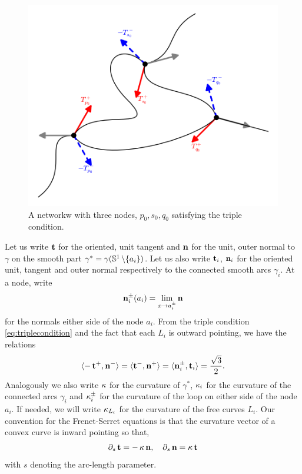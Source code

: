 \documentclass[11pt]{amsart}
\begin{document}
\begin{figure}[htb]
\centering
\includegraphics[width=.9\linewidth]{network}
\caption{A networkw with three nodes, $p_0, s_0, q_0$ satisfying the triple condition.}
\label{fg:network}
\end{figure}

Let us write \(\operatorname{\mathbf{t}}\) for the oriented, unit tangent and \(\operatorname{\mathbf{n}}\) for the unit, outer normal to \(\gamma\) on the smooth part \(\gamma^{\ast} = \gamma(\mathbb{S}^1\operatorname{\backslash}\{a_i\})\). Let us also write \(\operatorname{\mathbf{t}}_i\), \(\operatorname{\mathbf{n}}_i\) for the oriented unit, tangent and outer normal respectively to the connected smooth arcs \(\gamma_i\). At a node, write
\[
\operatorname{\mathbf{n}}_i^{\pm}(a_i) = \lim_{x\to a_i^{\pm}} \operatorname{\mathbf{n}}
\]
for the normals either side of the node \(a_i\). From the triple condition \eqref{eq:triplecondition} and the fact that each \(L_i\) is outward pointing, we have the relations
\begin{equation}
\label{eq:triplerelations}
\langle{-\operatorname{\mathbf{t}}^+},{\operatorname{\mathbf{n}}^-}\rangle = \langle{\operatorname{\mathbf{t}}^-},{\operatorname{\mathbf{n}}^+}\rangle = \langle{\operatorname{\mathbf{n}}_i^{\pm}},{\operatorname{\mathbf{t}}_i}\rangle = \frac{\sqrt{3}}{2}.
\end{equation}
Analogously we also write \(\operatorname{\kappa}\) for the curvature of \(\gamma^{\ast}\), \(\operatorname{\kappa}_i\) for the curvature of the connected arcs \(\gamma_i\) and \(\operatorname{\kappa}^{\pm}_i\) for the curvature of the loop on either side of the node \(a_i\). If needed, we will write \(\operatorname{\kappa}_{L_i}\) for the curvature of the free curves \(L_i\). Our convention for the Frenet-Serret equations is that the curvature vector of a convex curve is inward pointing so that,
\begin{equation}
\label{eq:frenetserret}
\partial_s \operatorname{\mathbf{t}} = -\operatorname{\kappa} \operatorname{\mathbf{n}}, \quad \partial_s \operatorname{\mathbf{n}} = \operatorname{\kappa} \operatorname{\mathbf{t}}
\end{equation}
with \(s\) denoting the arc-length parameter.
\end{document}
